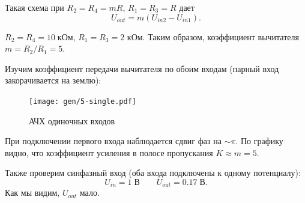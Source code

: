 \documentclass[12pt,a4paper]{article}
\begin{document}
	Такая схема при $R_2 = R_4 = mR$, $R_1 = R_3 = R$ дает
	$$U_{out} = m (U_{in2} - U_{in1}).$$
	
	$R_2 = R_4 = 10 \; \text{кОм}$, $R_1 = R_3 = 2$ кОм. Таким образом, коэффициент вычитателя $m = R_2 / R_1 = 5$.
	
	Изучим коэффициент передачи вычитателя по обоим входам (парный вход закорачивается на землю):
	
	\begin{figure}[H]
		\centering
		\texttt{[image: gen/5-single.pdf]}
		\caption{АЧХ одиночных входов}
		\label{single}
	\end{figure}

	При подключении первого входа наблюдается сдвиг фаз на $\sim \pi$.
	По графику видно, что коэффициент усиления в полосе пропускания $K \approx m = 5$.
	
	Также проверим синфазный вход (оба входа подключены к одному потенциалу):
	$$U_{in} = 1 \; \text{В} \qquad U_{out} = 0.17 \; \text{В}. $$
	Как мы видим, $U_{out}$ мало.
	
\end{document}
